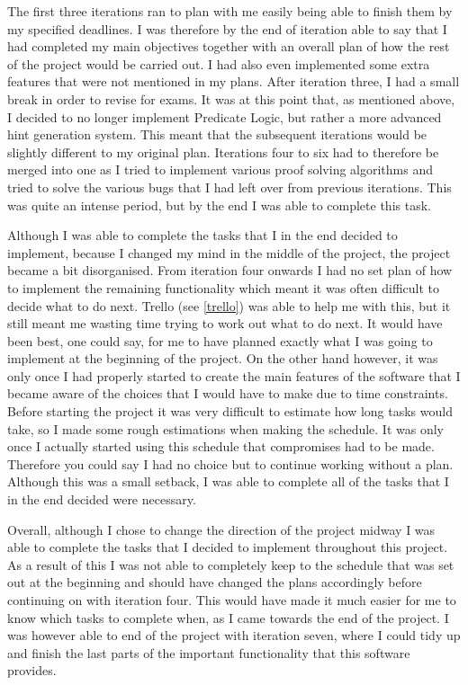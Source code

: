 The first three iterations ran to plan with me easily being able to finish them by my specified deadlines. I was therefore by the end of iteration able to say that I had completed my main objectives together with an overall plan of how the rest of the project would be carried out. I had also even implemented some extra features that were not mentioned in my plans. After iteration three, I had a small break in order to revise for exams. It was at this point that, as mentioned above, I decided to no longer implement Predicate Logic, but rather a more advanced hint generation system. This meant that the subsequent iterations would be slightly different to my original plan. Iterations four to six had to therefore be merged into one as I tried to implement various proof solving algorithms and tried to solve the various bugs that I had left over from previous iterations. This was quite an intense period, but by the end I was able to complete this task. 

Although I was able to complete the tasks that I in the end decided to implement, because I changed my mind in the middle of the project, the project became a bit disorganised. From iteration four onwards I had no set plan of how to implement the remaining functionality which meant it was often difficult to decide what to do next. Trello (see \ref{trello}) was able to help me with this, but it still meant me wasting time trying to work out what to do next. It would have been best, one could say, for me to have planned exactly what I was going to implement at the beginning of the project. On the other hand however, it was only once I had properly started to create the main features of the software that I became aware of the choices that I would have to make due to time constraints. Before starting the project it was very difficult to estimate how long tasks would take, so I made some rough estimations when making the schedule. It was only once I actually started using this schedule that compromises had to be made. Therefore you could say I had no choice but to continue working without a plan. Although this was a small setback, I was able to complete all of the tasks that I in the end decided were necessary.

Overall, although I chose to change the direction of the project midway I was able to complete the tasks that I decided to implement throughout this project. As a result of this I was not able to completely keep to the schedule that was set out at the beginning and should have changed the plans accordingly before continuing on with iteration four. This would have made it much easier for me to know which tasks to complete when, as I came towards the end of the project. I was however able to end of the project with iteration seven, where I could tidy up and finish the last parts of the important functionality that this software provides.

